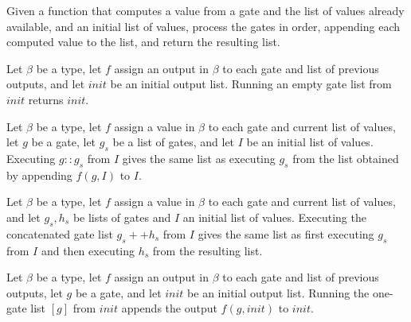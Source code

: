 \begin{definition}
\label{BoolCircuit.runWith}
\leanok
{}
Given a function that computes a value from a gate and the list of values already
available, and an initial list of values, process the gates in order, appending each
computed value to the list, and return the resulting list.
\end{definition}

\begin{theorem}
\label{BoolCircuit.runWith_nil}
\leanok
{}
Let $\beta$ be a type, let $f$ assign an output in $\beta$ to each gate and list of
previous outputs, and let $init$ be an initial output list. Running an empty gate list
from $init$ returns $init$.
\end{theorem}

\begin{theorem}
\label{BoolCircuit.runWith_cons}
\leanok
{}
Let $\beta$ be a type, let $f$ assign a value in $\beta$ to each gate and current list
of values, let $g$ be a gate, let $g_s$ be a list of gates, and let $I$ be an initial
list of values. Executing $g::g_s$ from $I$ gives the same list as executing $g_s$ from
the list obtained by appending $f(g,I)$ to $I$.
\end{theorem}

\begin{theorem}
\label{BoolCircuit.runWith_append}
\leanok
{}
Let $\beta$ be a type, let $f$ assign a value in $\beta$ to each gate and current list
of values, and let $g_s,h_s$ be lists of gates and $I$ an initial list of values.
Executing the concatenated gate list $g_s++h_s$ from $I$ gives the same list as first
executing $g_s$ from $I$ and then executing $h_s$ from the resulting list.
\end{theorem}

\begin{theorem}
\label{BoolCircuit.runWith_singleton}
\leanok
{}
Let $\beta$ be a type, let $f$ assign an output in $\beta$ to each gate and list of
previous outputs, let $g$ be a gate, and let $init$ be an initial output list. Running
the one-gate list $[g]$ from $init$ appends the output $f(g,init)$ to $init$.
\end{theorem}

